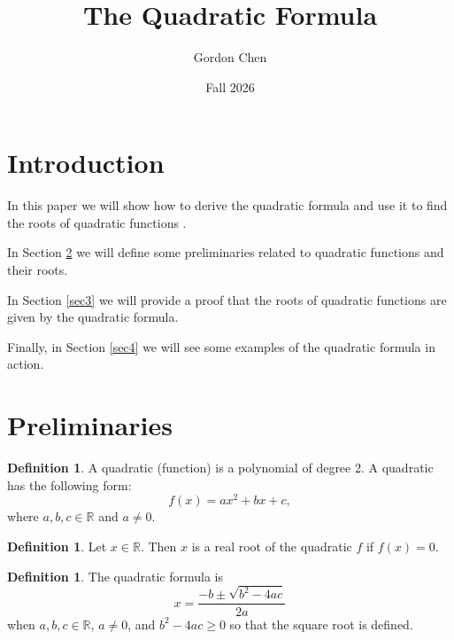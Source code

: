 \documentclass[12pt, letterpaper]{article}
\title{The Quadratic Formula}
\author{Gordon Chen}
\date{Fall 2026}
\theoremstyle{definition}
\newtheorem{defn}[thm]{Definition}
\begin{document}
\maketitle

\section{Introduction} \label{intro}
In this paper we will show how to derive the quadratic formula \cite{wiki:quadratic_formula}
and use it to find the roots \cite{wiki:roots} of
quadratic functions \cite{wiki:quadratic_equation}.

In Section \ref{sec2} we will define some preliminaries related to quadratic functions
and their roots.

In Section \ref{sec3} we will provide a proof that the roots of quadratic functions are
given by the quadratic formula.

Finally, in Section \ref{sec4} we will see some examples of the quadratic formula in action.


\section{Preliminaries} \label{sec2}
\begin{defn}
  A quadratic (function) is a polynomial \cite{wiki:polynomial}
  of degree 2. A quadratic has the following form:
    \[ f(x) = a x^2 + bx + c, \]
    where \(a, b, c \in \mathbb{R}\) and \(a \ne 0\).
\end{defn}

\begin{defn}
    Let \(x \in \mathbb{R}\). Then \(x\) is a real root of the quadratic \(f\) if \(f(x) = 0\).
\end{defn}

\begin{defn}
  The quadratic formula is \[ x = \frac{-b \pm \sqrt{b^2 - 4 a c}}{2a} \]
  when \(a, b, c \in \mathbb{R}\), \(a \ne 0\), and \(b^2 - 4 a c \ge 0\) so that the square root
  is defined.
\end{defn}
\end{document}
